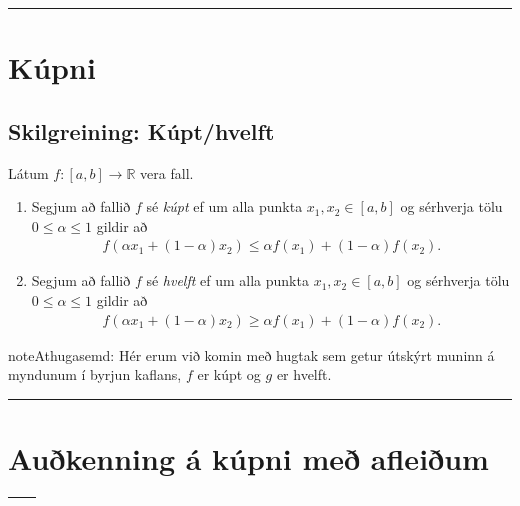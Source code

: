\documentclass[a4paper,10pt,icelandic]{sphinxmanual}
\begin{document}



\bigskip\hrule{}\bigskip



\section{Kúpni}
\label{kafli05:kupni}

\subsection{Skilgreining: Kúpt/hvelft}
\label{kafli05:index-0}\label{kafli05:skilgreining-kupt-hvelft}
Látum \(f:[a, b]\rightarrow {\mathbb  R}\) vera fall.
\begin{enumerate}
\item {} 
Segjum að fallið \(f\) sé \textit{kúpt} ef um
alla punkta \(x_1, x_2\in [a, b]\) og sérhverja tölu
\(0\leq
\alpha\leq 1\) gildir að
\begin{equation*}
\begin{split}f(\alpha x_1+(1-\alpha)x_2)\leq \alpha f(x_1)+(1-\alpha)f(x_2).\end{split}
\end{equation*}
\item {} 
Segjum að fallið \(f\) sé \textit{hvelft}
ef um alla punkta \(x_1, x_2\in [a, b]\) og sérhverja tölu
\(0\leq
\alpha\leq 1\) gildir að
\begin{equation*}
\begin{split}f(\alpha x_1+(1-\alpha)x_2)\geq \alpha f(x_1)+(1-\alpha)f(x_2).\end{split}
\end{equation*}
\end{enumerate}

\begin{notice}{note}{Athugasemd:}
Hér erum við komin með hugtak sem getur útskýrt muninn á myndunum í byrjun
kaflans, \(f\) er kúpt og \(g\) er hvelft.
\end{notice}


\bigskip\hrule{}\bigskip



\section{Auðkenning á kúpni með afleiðum}
\label{kafli05:aukenning-a-kupni-me-afleium}
\noindent\begin{tabulary}{\linewidth}{|L|L|}
\hline
{}\label{kafli05:id1}
&\label{kafli05:id2}
\\
\hline\end{tabulary}
\end{document}
